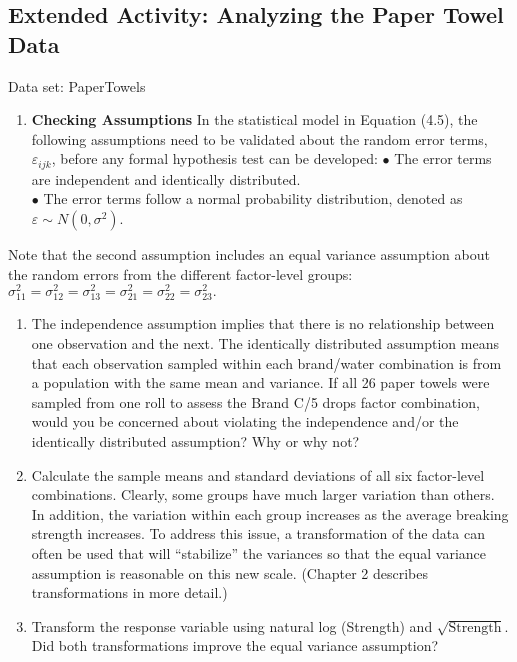 \documentclass[
]{report}
\providecommand{\tightlist}{%
  \setlength{\itemsep}{0pt}\setlength{\parskip}{0pt}}
\theoremstyle{definition}
\theoremstyle{definition}
\theoremstyle{definition}
\theoremstyle{definition}
\theoremstyle{remark}
\begin{document}
\hypertarget{extended-activity-analyzing-the-paper-towel-data}{%
\subsection{Extended Activity: Analyzing the Paper Towel Data}\label{extended-activity-analyzing-the-paper-towel-data}}

Data set: PaperTowels

\begin{enumerate}
\def\labelenumi{\arabic{enumi}.}
\setcounter{enumi}{33}
\tightlist
\item
  \textbf{Checking Assumptions} In the statistical model in Equation (4.5), the following assumptions need to be validated about the random error terms, \(\varepsilon_{ijk}\), before any formal hypothesis test can be developed:
  \(\bullet\) The error terms are independent and identically distributed.\\
  \(\bullet\) The error terms follow a normal probability distribution, denoted as \(\varepsilon \sim N(0,\sigma^2)\).
\end{enumerate}

Note that the second assumption includes an equal variance assumption about the random errors from the different factor-level groups:\\
\(\sigma^2_{11} = \sigma^2_{12} = \sigma^2_{13} = \sigma^2_{21} = \sigma^2_{22} = \sigma^2_{23}.\)

\begin{enumerate}
\def\labelenumi{\alph{enumi}.}
\item
  The independence assumption implies that there is no relationship between one observation and the next. The identically distributed assumption means that each observation sampled within each brand/water combination is from a population with the same mean and variance. If all 26 paper towels were sampled from one roll to assess the Brand C/5 drops factor combination, would you be concerned about violating the independence and/or the identically distributed assumption? Why or why not?
\item
  Calculate the sample means and standard deviations of all six factor-level combinations. Clearly, some groups have much larger variation than others. In addition, the variation within each group increases as the average breaking strength increases. To address this issue, a transformation of the data can often be used that will ``stabilize'' the variances so that the equal variance assumption is reasonable on this new scale. (Chapter 2 describes transformations in more detail.)
\item
  Transform the response variable using natural log (Strength) and \(\sqrt{\text{Strength}}\). Did both transformations improve the equal variance assumption?
\end{enumerate}
\end{document}
